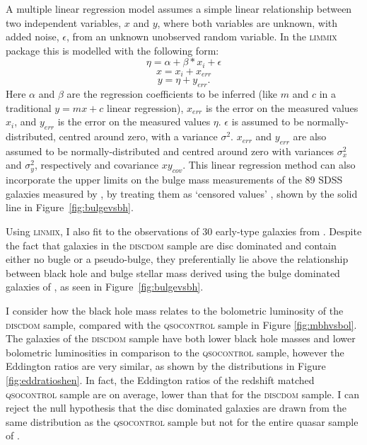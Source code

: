 {A multiple linear regression model assumes a simple linear relationship between two independent variables, $x$ and $y$, where both variables are unknown, with added noise, $\epsilon$, from an unknown unobserved random variable. In the \textsc{limmix} package this is modelled with the following form:
\begin{equation}\label{2dlinemodel}
\eta = \alpha + \beta * x_i + \epsilon
\end{equation}
\begin{equation}\label{2dlinemodel2}
x = x_i + x_{err}
\end{equation}
\begin{equation}\label{2dlinemodel3}
y = \eta + y_{err}.
\end{equation}
Here $\alpha$ and $\beta$ are the regression coefficients to be inferred (like $m$ and $c$ in a traditional $y=mx + c$ linear regression), $x_{err}$ is the error on the measured values $x_i$, and $y_{err}$ is the error on the measured values $\eta$. $\epsilon$ is assumed to be normally-distributed, centred around zero, with a variance $\sigma^2$. $x_{err}$ and $y_{err}$ are also assumed to be normally-distributed and centred around zero with variances $\sigma_x^2$ and $\sigma_y^2$, respectively and covariance $xy_{cov}$. This linear regression method can also incorporate the upper limits on the bulge mass measurements of the 89 SDSS galaxies measured by \citet[][see Section \ref{sec:galmass}]{simard11},  by treating them as `censored values' \citep[see Section 7.2 of][]{kelly07}, shown by the solid line in Figure~\ref{fig:bulgevsbh}.

Using \textsc{linmix}, I also fit to the observations of 30 early-type galaxies from \citet{haringrix04}. Despite the fact that galaxies in the \textsc{discdom} sample are disc dominated and contain either no bugle or a pseudo-bulge, they preferentially lie above the relationship between black hole and bulge stellar mass derived using the bulge dominated galaxies of \citet{haringrix04}, as seen in Figure~\ref{fig:bulgevsbh}. 

I consider how the black hole mass relates to the bolometric luminosity of the \textsc{discdom} sample, compared with the \textsc{qsocontrol} sample in Figure \ref{fig:mbhvsbol}. The galaxies of the \textsc{discdom} sample have both lower black hole masses and lower bolometric luminosities in comparison to the \textsc{qsocontrol} sample, however the Eddington ratios are very similar, as shown by the distributions in Figure \ref{fig:eddratioshen}. In fact, the Eddington ratios of the redshift matched \textsc{qsocontrol} sample are on average, lower than that for the \textsc{discdom} sample. I can reject the null hypothesis that the disc dominated galaxies are drawn from the same distribution as the \textsc{qsocontrol} sample but not for the entire quasar sample of \citet{shen11}.

}
